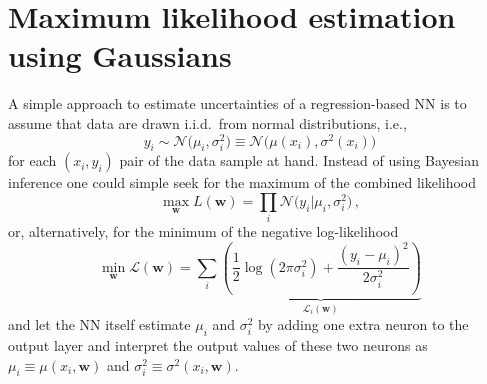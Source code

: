 \documentclass{article}
\begin{document}
\newpage
\appendix
\section{Maximum likelihood estimation using Gaussians}
\label{sec:gfit}
A simple approach to estimate uncertainties of a regression-based NN is to assume that data are drawn i.i.d.\ from normal distributions, i.e.,
\begin{equation}
    y_i \sim \mathcal{N} \big( \mu_i, \sigma_i^2 \big) \equiv \mathcal{N} \big( \mu(x_i), \sigma^2(x_i) \big)
\end{equation}
for each $(x_i, y_i)$ pair of the data sample at hand.
Instead of using Bayesian inference one could simple seek for the maximum of the combined likelihood
\begin{equation}
    \max\limits_{\bm{w}} L(\bm{w}) = \prod\limits_i \mathcal{N} \big( y_i \big| \mu_i, \sigma_i^2 \big) \,,
\end{equation}
or, alternatively, for the minimum of the negative log-likelihood
\begin{equation}
    \label{eq:minnllgaussian}
    \min\limits_{\bm{w}} \mathcal{L}(\bm{w}) = \sum\limits_i \underbrace{\left( \frac{1}{2} \log (2\pi\sigma_i^2) + \frac{(y_i - \mu_i)^2}{2 \sigma_i^2} \right)}_{\mathcal{L}_i(\bm{w})}
\end{equation}
and let the NN itself estimate $\mu_i$ and $\sigma_i^2$ by adding one extra neuron to the output layer and interpret the output values of these two neurons as $\mu_i \equiv \mu(x_i, \bm{w})$ and $\sigma_i^2 \equiv \sigma^2(x_i, \bm{w})$.
\end{document}
